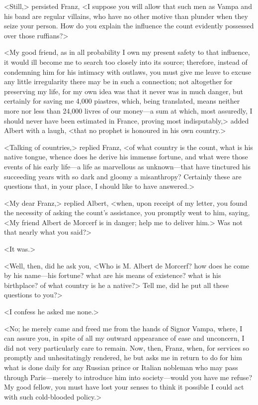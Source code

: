  <Still,> persisted Franz, <I suppose you will allow that such men as Vampa and his band are regular villains, who have no other motive than plunder when they seize your person. How do you explain the influence the count evidently possessed over those ruffians?> 

 <My good friend, as in all probability I own my present safety to that influence, it would ill become me to search too closely into its source; therefore, instead of condemning him for his intimacy with outlaws, you must give me leave to excuse any little irregularity there may be in such a connection; not altogether for preserving my life, for my own idea was that it never was in much danger, but certainly for saving me 4,000 piastres, which, being translated, means neither more nor less than 24,000 livres of our money—a sum at which, most assuredly, I should never have been estimated in France, proving most indisputably,> added Albert with a laugh, <that no prophet is honoured in his own country.> 

 <Talking of countries,> replied Franz, <of what country is the count, what is his native tongue, whence does he derive his immense fortune, and what were those events of his early life—a life as marvellous as unknown—that have tinctured his succeeding years with so dark and gloomy a misanthropy? Certainly these are questions that, in your place, I should like to have answered.> 

 <My dear Franz,> replied Albert, <when, upon receipt of my letter, you found the necessity of asking the count's assistance, you promptly went to him, saying, <My friend Albert de Morcerf is in danger; help me to deliver him.> Was not that nearly what you said?>

<It was.> 

 <Well, then, did he ask you, <Who is M. Albert de Morcerf? how does he come by his name—his fortune? what are his means of existence? what is his birthplace? of what country is he a native?> Tell me, did he put all these questions to you?> 

 <I confess he asked me none.> 

 <No; he merely came and freed me from the hands of Signor Vampa, where, I can assure you, in spite of all my outward appearance of ease and unconcern, I did not very particularly care to remain. Now, then, Franz, when, for services so promptly and unhesitatingly rendered, he but asks me in return to do for him what is done daily for any Russian prince or Italian nobleman who may pass through Paris—merely to introduce him into society—would you have me refuse? My good fellow, you must have lost your senses to think it possible I could act with such cold-blooded policy.> 

